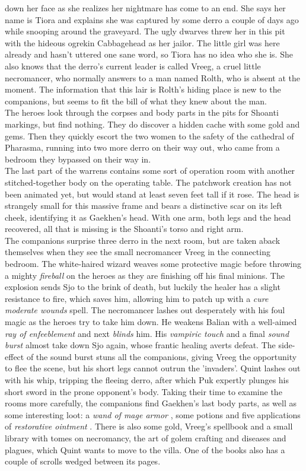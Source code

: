 down her face as she realizes her nightmare has come to an end. She says her name is Tiora and explains she was captured by some derro a couple of days ago while snooping around the graveyard. The ugly dwarves threw her in this pit with the hideous ogrekin Cabbagehead as her jailor. The little girl was here already and hasn't uttered one sane word, so Tiora has no idea who she is. She also knows that the derro's current leader is called Vreeg, a cruel little necromancer, who normally answers to a man named Rolth, who is absent at the moment. The information that this lair is Rolth's hiding place is new to the companions, but seems to fit the bill of what they knew about the man.\\

The heroes look through the corpses and body parts in the pits for Shoanti markings, but find nothing. They do discover a hidden cache with some gold and gems. Then they quickly escort the two women to the safety of the cathedral of Pharasma, running into two more derro on their way out, who came from a bedroom they bypassed on their way in.\\

The last part of the warrens contains some sort of operation room with another stitched-together body on the operating table. The patchwork creation has not been animated yet, but would stand at least seven feet tall if it rose. The head is strangely small for this massive frame and bears a distinctive scar on its left cheek, identifying it as Gaekhen's head. With one arm, both legs and the head recovered, all that is missing is the Shoanti's torso and right arm.\\

The companions surprise three derro in the next room, but are taken aback themselves when they see the small necromancer Vreeg in the connecting bedroom. The white-haired wizard weaves some protective magic before throwing a mighty {\itshape fireball} on the heroes as they are finishing off his final minions. The explosion sends Sjo to the brink of death, but luckily the healer has a slight resistance to fire, which saves him, allowing him to patch up with a  {\itshape cure moderate wounds} spell. The necromancer lashes out desperately with his foul magic as the heroes try to take him down. He weakens Balian with a well-aimed  {\itshape ray of enfeeblement} and next  {\itshape blinds} him. His  {\itshape vampiric touch} and a final  {\itshape sound burst} almost take down Sjo again, whose frantic healing averts defeat. The side-effect of the sound burst stuns all the companions, giving Vreeg the opportunity to flee the scene, but his short legs cannot outrun the 'invaders'. Quint lashes out with his whip, tripping the fleeing derro, after which Puk expertly plunges his short sword in the prone opponent's body. Taking their time to examine the rooms more carefully, the companions find Gaekhen's last body parts, as well as some interesting loot: a {\itshape wand of mage armor} , some potions and five applications of  {\itshape restorative ointment} . There is also some gold, Vreeg's spellbook and a small library with tomes on necromancy, the art of golem crafting and diseases and plagues, which Quint wants to move to the villa. One of the books also has a couple of scrolls wedged between its pages. 